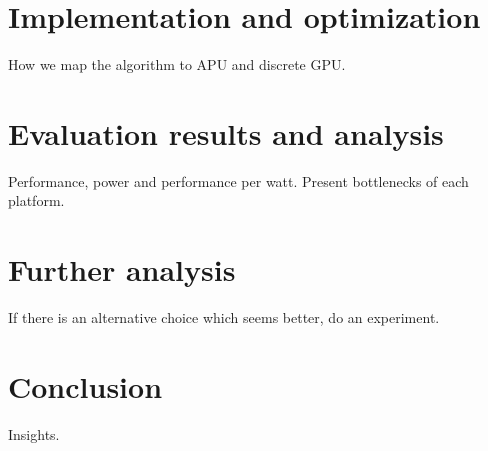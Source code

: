 \section{Implementation and optimization}

How we map the algorithm to APU and discrete GPU.

\section{Evaluation results and analysis}

Performance, power and performance per watt. Present bottlenecks of each platform.

\section{Further analysis}

If there is an alternative choice which seems better, do an experiment.

\section{Conclusion}

Insights.





